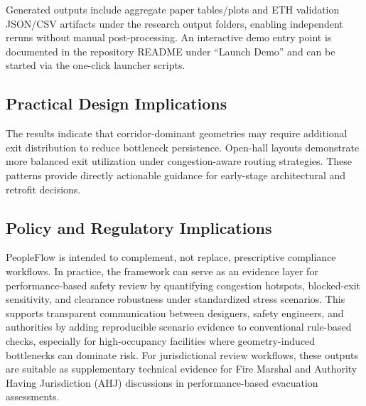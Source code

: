 \documentclass[utf8]{FrontiersinHarvard}
\begin{document}
Generated outputs include aggregate paper tables/plots and ETH validation JSON/CSV artifacts under the research output folders, enabling independent reruns without manual post-processing. An interactive demo entry point is documented in the repository README under ``Launch Demo'' and can be started via the one-click launcher scripts.

\subsection{Practical Design Implications}
The results indicate that corridor-dominant geometries may require additional exit distribution to reduce bottleneck persistence. Open-hall layouts demonstrate more balanced exit utilization under congestion-aware routing strategies. These patterns provide directly actionable guidance for early-stage architectural and retrofit decisions.

\subsection{Policy and Regulatory Implications}
PeopleFlow is intended to complement, not replace, prescriptive compliance workflows. In practice, the framework can serve as an evidence layer for performance-based safety review by quantifying congestion hotspots, blocked-exit sensitivity, and clearance robustness under standardized stress scenarios. This supports transparent communication between designers, safety engineers, and authorities by adding reproducible scenario evidence to conventional rule-based checks, especially for high-occupancy facilities where geometry-induced bottlenecks can dominate risk.
For jurisdictional review workflows, these outputs are suitable as supplementary technical evidence for Fire Marshal and Authority Having Jurisdiction (AHJ) discussions in performance-based evacuation assessments.
\end{document}
